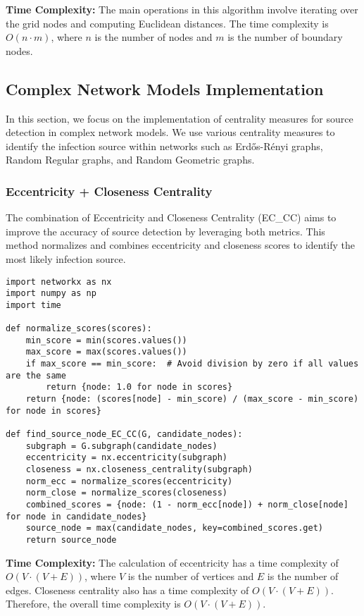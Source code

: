 \textbf{Time Complexity:} The main operations in this algorithm involve iterating over the grid nodes and computing Euclidean distances. The time complexity is \(O(n \cdot m)\), where \(n\) is the number of nodes and \(m\) is the number of boundary nodes.

\subsection{Complex Network Models Implementation}
In this section, we focus on the implementation of centrality measures for source detection in complex network models. We use various centrality measures to identify the infection source within networks such as Erdős-Rényi graphs, Random Regular graphs, and Random Geometric graphs.

\subsubsection{Eccentricity + Closeness Centrality}

The combination of Eccentricity and Closeness Centrality (EC\_CC) aims to improve the accuracy of source detection by leveraging both metrics. This method normalizes and combines eccentricity and closeness scores to identify the most likely infection source.

\begin{lstlisting}[caption=Eccentricity + Closeness Centrality, label=lst:ec-cc]
import networkx as nx
import numpy as np
import time

def normalize_scores(scores):
    min_score = min(scores.values())
    max_score = max(scores.values())
    if max_score == min_score:  # Avoid division by zero if all values are the same
        return {node: 1.0 for node in scores}
    return {node: (scores[node] - min_score) / (max_score - min_score) for node in scores}

def find_source_node_EC_CC(G, candidate_nodes):
    subgraph = G.subgraph(candidate_nodes)
    eccentricity = nx.eccentricity(subgraph)
    closeness = nx.closeness_centrality(subgraph)
    norm_ecc = normalize_scores(eccentricity)
    norm_close = normalize_scores(closeness)
    combined_scores = {node: (1 - norm_ecc[node]) + norm_close[node] for node in candidate_nodes}
    source_node = max(candidate_nodes, key=combined_scores.get)
    return source_node
\end{lstlisting}

\textbf{Time Complexity:} The calculation of eccentricity has a time complexity of \(O(V \cdot (V + E))\), where \(V\) is the number of vertices and \(E\) is the number of edges. Closeness centrality also has a time complexity of \(O(V \cdot (V + E))\). Therefore, the overall time complexity is \(O(V \cdot (V + E))\).

